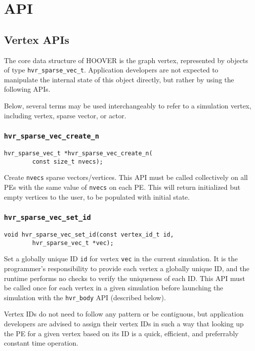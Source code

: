 \section{API}

\subsection{Vertex APIs}

The core data structure of HOOVER is the graph vertex, represented by objects of
type \texttt{hvr\_sparse\_vec\_t}. Application developers are not expected to
manipulate the internal state of this object directly, but rather by using the
following APIs.

Below, several terms may be used interchangeably to refer to a simulation
vertex, including vertex, sparse vector, or actor.

\subsubsection{\texttt{hvr\_sparse\_vec\_create\_n}}

\begin{verbatim}
hvr_sparse_vec_t *hvr_sparse_vec_create_n(
        const size_t nvecs);
\end{verbatim}

Create \texttt{nvecs} sparse vectors/vertices. This API must be called
collectively on all PEs with the same value of \texttt{nvecs} on each PE. This
will return initialized but empty vertices to the user, to be populated with
initial state.

\subsubsection{\texttt{hvr\_sparse\_vec\_set\_id}}

\begin{verbatim}
void hvr_sparse_vec_set_id(const vertex_id_t id,
        hvr_sparse_vec_t *vec);
\end{verbatim}

Set a globally unique ID \texttt{id} for vertex \texttt{vec} in the current
simulation. It is the programmer's responsibility to provide each vertex a
globally unique ID, and the runtime performs no checks to verify the uniqueness
of each ID. This API must be called once for each vertex in a given simulation
before launching the simulation with the \texttt{hvr\_body} API (described
below).

Vertex IDs do not need to follow any pattern or be contiguous, but application
developers are advised to assign their vertex IDs in such a way that looking up
the PE for a given vertex based on its ID is a quick, efficient, and preferrably
constant time operation.

